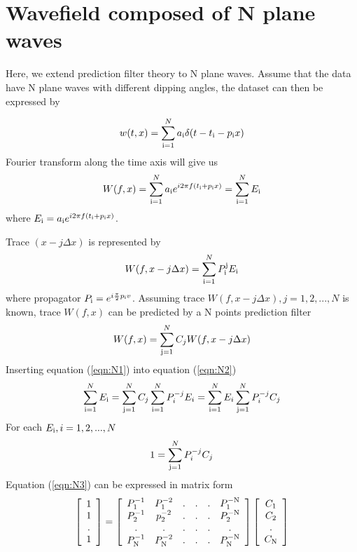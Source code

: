 \appendix
\section{Wavefield composed of N plane waves}
Here, we extend prediction filter theory to N plane waves. Assume that the 
data have N plane waves with different dipping angles, the dataset can then be 
expressed by

\begin{equation}
	w(t,x) = \sum_{\rm i=1}^N a_{\rm i} \delta(t-t_{\rm i}-p_{\rm i}x)
\end{equation}
Fourier transform along the time axis will give us
\begin{equation}
	W(f,x) = \sum_{\rm i=1}^N a_{\rm i} e^{i 2\pi f (t_{\rm i}+p_{\rm i} x)} = \sum_{\rm i=1}^N E_{\rm i}
\label{eqn:N1}
\end{equation}
where $E_{\rm i}=a_{\rm i} e^{i 2\pi f(t_{\rm i}+p_{\rm i}x)}$.
\par
Trace $(x-j\Delta x)$ is represented by
\begin{equation}
	W(f, x-j\Delta x)=\sum_{\rm i=1}^N P_{\rm i}^{\rm j}E_{\rm i}
\end{equation}
where propagator $P_{\rm i}=e^{i\frac{\pi}{2}p_{\rm i}v}$.
Assuming trace $W(f, x-j\Delta x), j=1,2,...,N$ is known, trace $W(f,x)$ can 
be predicted by a N points prediction filter
\begin{equation}
	W(f,x) = \sum_{\rm j=1}^N C_j W(f,x-j\Delta x)
\label{eqn:N2}
\end{equation}
Inserting equation (\ref{eqn:N1}) into equation (\ref{eqn:N2})
\begin{equation}
	\sum_{\rm i=1}^N E_{\rm i} = \sum_{\rm j=1}^N C_j \sum_{\rm i=1}^N P^{-j}_i E_i = \sum_{\rm i=1}^N E_i \sum_{\rm j=1}^N P^{-j}_i C_j
\end{equation}
For each $E_{\rm i}, i = 1,2,...,N$
\begin{equation}
	1 = \sum_{\rm j=1}^N P^{-j}_i C_j
\label{eqn:N3}
\end{equation}
Equation (\ref{eqn:N3}) can be expressed in matrix form
\begin{equation}
\left[\begin{array}{c}
 1 \\
 1 \\
 . \\
 1 
\end{array}  \right]
=
\left[\begin{array}{cccccc}
 P_1^{-1} & P_1^{-2} & . & . & . & P_1^{\rm -N} \\
 P_2^{-1} & p_2^{-2} & . & . & . & P_2^{\rm -N} \\
    .     &    .     & . & . & . &    .    \\
 P_{\rm N}^{-1} & P_{\rm N}^{-2} & . & . &. & P_{\rm N}^{\rm -N} 
\end{array}  \right]
\left[\begin{array}{c}
 C_1 \\
 C_2 \\
 . \\
 C_{\rm N} 
\end{array}  \right]
\label{eqn:N4}
\end{equation}
